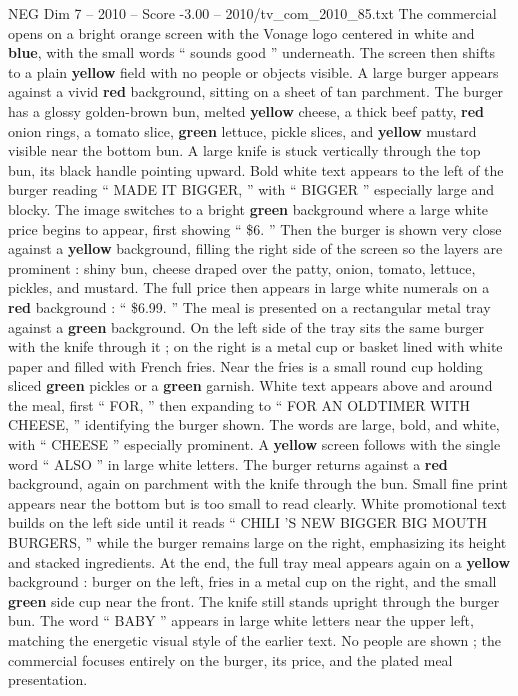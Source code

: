 \begin{textsample}{NEG Dim 7 – 2010 – Score -3.00 – 2010/tv\_com\_2010\_85.txt}  \label{ex:f7_neg_047}
The commercial opens on a bright orange screen with the Vonage logo centered in white and \textbf{blue}, with the small words “ sounds good ” underneath.
The screen then shifts to a plain \textbf{yellow} field with no people or objects visible.
A large burger appears against a vivid \textbf{red} background, sitting on a sheet of tan parchment.
The burger has a glossy golden-brown bun, melted \textbf{yellow} cheese, a thick beef patty, \textbf{red} onion rings, a tomato slice, \textbf{green} lettuce, pickle slices, and \textbf{yellow} mustard visible near the bottom bun.
A large knife is stuck vertically through the top bun, its black handle pointing upward.
Bold white text appears to the left of the burger reading “ MADE IT BIGGER, ” with “ BIGGER ” especially large and blocky.
The image switches to a bright \textbf{green} background where a large white price begins to appear, first showing “ \$6. ” Then the burger is shown very close against a \textbf{yellow} background, filling the right side of the screen so the layers are prominent : shiny bun, cheese draped over the patty, onion, tomato, lettuce, pickles, and mustard.
The full price then appears in large white numerals on a \textbf{red} background : “ \$6.99. ” The meal is presented on a rectangular metal tray against a \textbf{green} background.
On the left side of the tray sits the same burger with the knife through it ; on the right is a metal cup or basket lined with white paper and filled with French fries.
Near the fries is a small round cup holding sliced \textbf{green} pickles or a \textbf{green} garnish.
White text appears above and around the meal, first “ FOR, ” then expanding to “ FOR AN OLDTIMER WITH CHEESE, ” identifying the burger shown.
The words are large, bold, and white, with “ CHEESE ” especially prominent.
A \textbf{yellow} screen follows with the single word “ ALSO ” in large white letters.
The burger returns against a \textbf{red} background, again on parchment with the knife through the bun.
Small fine print appears near the bottom but is too small to read clearly.
White promotional text builds on the left side until it reads “ CHILI ’S NEW BIGGER BIG MOUTH BURGERS, ” while the burger remains large on the right, emphasizing its height and stacked ingredients.
At the end, the full tray meal appears again on a \textbf{yellow} background : burger on the left, fries in a metal cup on the right, and the small \textbf{green} side cup near the front.
The knife still stands upright through the burger bun.
The word “ BABY ” appears in large white letters near the upper left, matching the energetic visual style of the earlier text.
No people are shown ; the commercial focuses entirely on the burger, its price, and the plated meal presentation.

\end{textsample}
